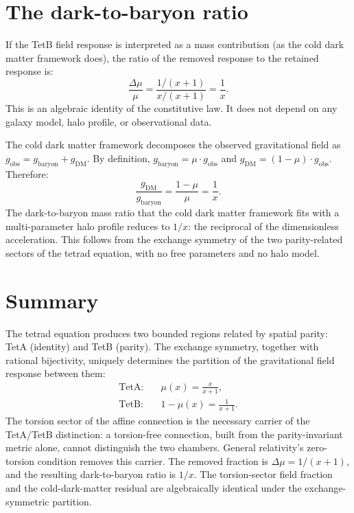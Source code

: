 \documentclass[twocolumn]{iopjournal}
\begin{document}

\section*{The dark-to-baryon ratio}

If the TetB field response is interpreted as a mass
contribution (as the cold dark matter framework does), the
ratio of the removed response to the retained response is:
\begin{equation}
  \frac{\Delta\mu}{\mu}
  = \frac{1/(x+1)}{x/(x+1)}
  = \frac{1}{x}.
  \label{eq:ratio}
\end{equation}
This is an algebraic identity of the constitutive law. It
does not depend on any galaxy model, halo profile, or
observational data.

The cold dark matter framework decomposes the observed
gravitational field as $g_{\mathrm{obs}} = g_{\mathrm{baryon}}
+ g_{\mathrm{DM}}$. By definition,
$g_{\mathrm{baryon}} = \mu \cdot g_{\mathrm{obs}}$ and
$g_{\mathrm{DM}} = (1 - \mu) \cdot g_{\mathrm{obs}}$.
Therefore:
\begin{equation}
  \frac{g_{\mathrm{DM}}}{g_{\mathrm{baryon}}}
  = \frac{1 - \mu}{\mu}
  = \frac{1}{x}.
  \label{eq:cdm_ratio}
\end{equation}
The dark-to-baryon mass ratio that the cold dark matter
framework fits with a multi-parameter halo profile reduces
to $1/x$: the reciprocal of the dimensionless acceleration.
This follows from the exchange symmetry of the two
parity-related sectors of the tetrad equation, with no free
parameters and no halo model.


\section*{Summary}

The tetrad equation produces two bounded regions related by
spatial parity: TetA (identity) and TetB (parity). The
exchange symmetry, together with rational bijectivity, uniquely
determines the partition of the gravitational field response
between them:
\begin{align}
  \text{TetA:} \quad & \mu(x) = \frac{x}{x + 1},
  \label{eq:sum_mu} \\[4pt]
  \text{TetB:} \quad & 1 - \mu(x) = \frac{1}{x + 1}.
  \label{eq:sum_tetb}
\end{align}
The torsion sector of the affine connection is the necessary
carrier of the TetA/TetB distinction: a torsion-free connection,
built from the parity-invariant metric alone, cannot distinguish
the two chambers. General relativity's zero-torsion condition
removes this carrier. The removed fraction is
$\Delta\mu = 1/(x+1)$, and the resulting dark-to-baryon
ratio is $1/x$. The torsion-sector field fraction and the
cold-dark-matter residual are algebraically identical under the
exchange-symmetric partition.
\end{document}
